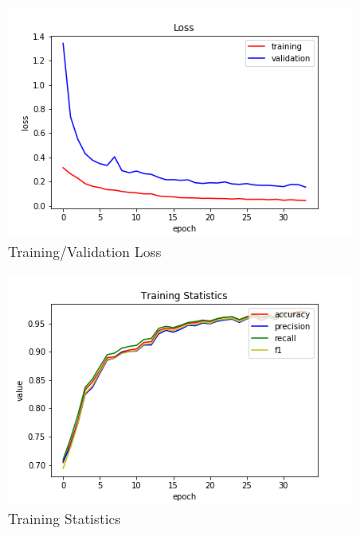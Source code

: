 \begin{figure}[h!]
  \centerfloat
  \begin{subfigure}[b]{0.35\linewidth}
    \includegraphics[width=\linewidth]{images/cae_online_lstm/caelstm_section_lstm_training_uniform_random_fill_10000_model_loss.png}
     \caption{Training/Validation Loss}
  \end{subfigure}
  \hfill
  \begin{subfigure}[b]{0.35\linewidth}
    \includegraphics[width=\linewidth]{images/cae_online_lstm/caelstm_section_lstm_training_uniform_random_fill_10000_model_training_stats.png}
     \caption{Training Statistics}
  \end{subfigure}
  \hfill
  \begin{subfigure}[b]{0.35\linewidth}

\end{subfigure}
\end{figure}
